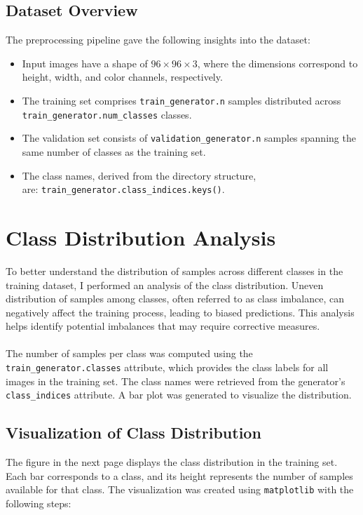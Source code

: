 \documentclass{article}
\begin{document}
\subsection{Dataset Overview}

The preprocessing pipeline gave the following insights into the dataset:
\begin{itemize}
    \item Input images have a shape of \(96 \times 96 \times 3\), where the dimensions correspond to height, width, and color channels, respectively.
    \item The training set comprises \texttt{train\_generator.n} samples distributed across \texttt{train\_generator.num\_classes} classes.
    \item The validation set consists of \texttt{validation\_generator.n} samples spanning the same number of classes as the training set.
    \item The class names, derived from the directory structure, \\ are: \texttt{train\_generator.class\_indices.keys()}.
\end{itemize}

\section{Class Distribution Analysis}

To better understand the distribution of samples across different classes in the training dataset, I performed an analysis of the class distribution. Uneven distribution of samples among classes, often referred to as class imbalance, can negatively affect the training process, leading to biased predictions. This analysis helps identify potential imbalances that may require corrective measures.
\\\\
The number of samples per class was computed using the \texttt{train\_generator.classes} attribute, which provides the class labels for all images in the training set. The class names were retrieved from the generator's \texttt{class\_indices} attribute. A bar plot was generated to visualize the distribution.

\subsection{Visualization of Class Distribution}

The figure in the next page displays the class distribution in the training set. Each bar corresponds to a class, and its height represents the number of samples available for that class. The visualization was created using \texttt{matplotlib} with the following steps:
\end{document}
